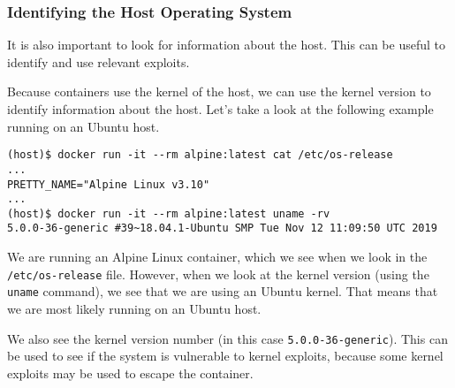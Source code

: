 \subsubsection{Identifying the Host Operating System}\label{subsubsection:identify-host-os}
It is also important to look for information about the host. This can be useful to identify and use relevant exploits.

\medskip

Because containers use the kernel of the host, we can use the kernel version to identify information about the host. Let's take a look at the following example running on an Ubuntu host.
\begin{lstlisting}[caption={\lstinline{/etc/os-release} and \lstinline{uname} differ.},captionpos=b]
(host)$ docker run -it --rm alpine:latest cat /etc/os-release
...
PRETTY_NAME="Alpine Linux v3.10"
...
(host)$ docker run -it --rm alpine:latest uname -rv
5.0.0-36-generic #39~18.04.1-Ubuntu SMP Tue Nov 12 11:09:50 UTC 2019
\end{lstlisting}

We are running an Alpine Linux container, which we see when we look in the \lstinline{/etc/os-release} file. However, when we look at the kernel version (using the \lstinline{uname} command), we see that we are using an Ubuntu kernel. That means that we are most likely running on an Ubuntu host.

\medskip

We also see the kernel version number (in this case \lstinline{5.0.0-36-generic}). This can be used to see if the system is vulnerable to kernel exploits, because some kernel exploits may be used to escape the container.
